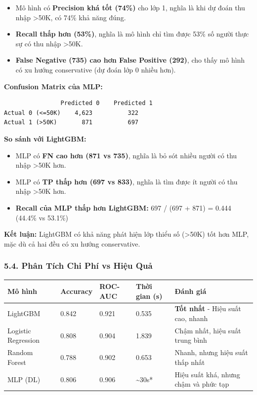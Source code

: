 \documentclass[
]{article}
\newcounter{none} %
\providecommand{\tightlist}{%
  \setlength{\itemsep}{0pt}\setlength{\parskip}{0pt}}
\begin{document}
\begin{itemize}
\tightlist
\item
  Mô hình có \textbf{Precision khá tốt (74\%)} cho lớp 1, nghĩa là khi
  dự đoán thu nhập \textgreater50K, có 74\% khả năng đúng.
\item
  \textbf{Recall thấp hơn (53\%)}, nghĩa là mô hình chỉ tìm được 53\% số
  người thực sự có thu nhập \textgreater50K.
\item
  \textbf{False Negative (735) cao hơn False Positive (292)}, cho thấy
  mô hình có xu hướng conservative (dự đoán lớp 0 nhiều hơn).
\end{itemize}

\textbf{Confusion Matrix của MLP:}

\begin{verbatim}
                Predicted 0    Predicted 1
Actual 0 (<=50K)    4,623          322
Actual 1 (>50K)       871          697
\end{verbatim}

\textbf{So sánh với LightGBM:}

\begin{itemize}
\tightlist
\item
  MLP có \textbf{FN cao hơn (871 vs 735)}, nghĩa là bỏ sót nhiều người
  có thu nhập \textgreater50K hơn.
\item
  MLP có \textbf{TP thấp hơn (697 vs 833)}, nghĩa là tìm được ít người
  có thu nhập \textgreater50K hơn.
\item
  \textbf{Recall của MLP thấp hơn LightGBM:} 697 / (697 + 871) = 0.444
  (44.4\% vs 53.1\%)
\end{itemize}

\textbf{Kết luận:} LightGBM có khả năng phát hiện lớp thiểu số
(\textgreater50K) tốt hơn MLP, mặc dù cả hai đều có xu hướng
conservative.

\subsubsection{5.4. Phân Tích Chi Phí vs Hiệu
Quả}\label{54-phuxe2n-tuxedch-chi-phuxed-vs-hiux1ec7u-quux1ea3}

{\def\LTcaptype{none} %
\begin{longtable}[]{@{}lllll@{}}
\toprule\noalign{}
Mô hình & Accuracy & ROC-AUC & Thời gian (s) & Đánh giá \\
\midrule\noalign{}
\endhead
\bottomrule\noalign{}
\endlastfoot
LightGBM & 0.842 & 0.921 & 0.535 & \textbf{Tốt nhất} - Hiệu suất cao,
nhanh \\
Logistic Regression & 0.808 & 0.904 & 1.839 & Chậm nhất, hiệu suất trung
bình \\
Random Forest & 0.788 & 0.902 & 0.653 & Nhanh, nhưng hiệu suất thấp
nhất \\
MLP (DL) & 0.806 & 0.906 & \textasciitilde30s* & Hiệu suất khá, nhưng
chậm và phức tạp \\
\end{longtable}
}
\end{document}
